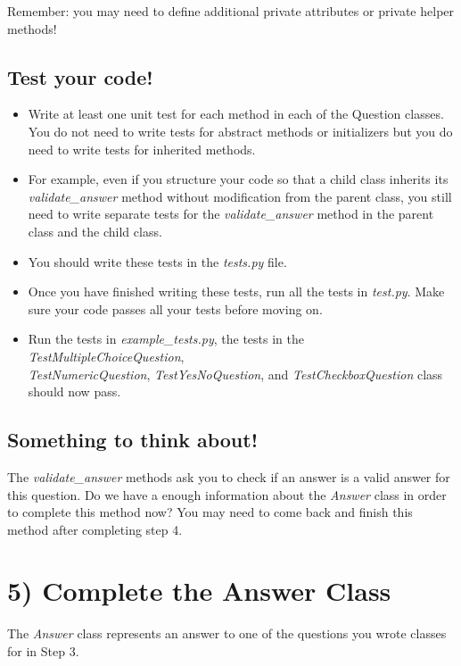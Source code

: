 \documentclass[12pt]{article}
\begin{document}
\noindent Remember: you may need to define additional private attributes or
private helper methods!

\subsection*{Test your code!}
\begin{itemize}
    \item Write at least one unit test for each method in each of the Question classes. You
    do not need to write tests for abstract methods or initializers but you do need
    to write tests for inherited methods.
    \item For example, even if you structure your code so that a child class inherits its
    \textit{validate\_answer} method without modification from the parent class, you still need
    to write separate tests for the \textit{validate\_answer} method in the parent
    class and the child class.
    \item You should write these tests in the \textit{tests.py} file.
    \item Once you have finished writing these tests, run all the tests in \textit{test.py}.
    Make sure your code passes all your tests before moving on.
    \item Run the tests in \textit{example\_tests.py}, the tests in the
    \textit{TestMultipleChoiceQuestion},\\ \textit{TestNumericQuestion},
    \textit{TestYesNoQuestion}, and \textit{TestCheckboxQuestion} class should now pass.
\end{itemize}

\subsection*{Something to think about!}
The \textit{validate\_answer} methods ask you to check if an answer is a valid answer for
this question. Do we have a enough information about the \textit{Answer} class
in order to complete this method now? You may need to come back and finish this
method after completing step 4.

\bigskip

\section*{5) Complete the Answer Class}
The \textit{Answer} class represents an answer to one of the questions you wrote
classes for in Step 3.
\end{document}
